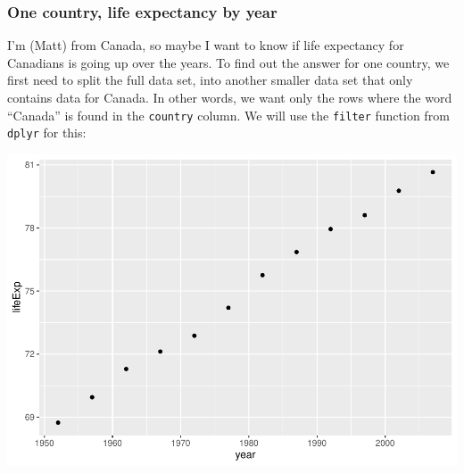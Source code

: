 \documentclass[]{book}
\newenvironment{Shaded}{\begin{snugshade}}{\end{snugshade}}
\newcommand{\KeywordTok}[1]{\textcolor[rgb]{0.13,0.29,0.53}{\textbf{#1}}}
\newcommand{\DataTypeTok}[1]{\textcolor[rgb]{0.13,0.29,0.53}{#1}}
\newcommand{\StringTok}[1]{\textcolor[rgb]{0.31,0.60,0.02}{#1}}
\newcommand{\CommentTok}[1]{\textcolor[rgb]{0.56,0.35,0.01}{\textit{#1}}}
\newcommand{\OperatorTok}[1]{\textcolor[rgb]{0.81,0.36,0.00}{\textbf{#1}}}
\newcommand{\NormalTok}[1]{#1}
\begin{document}
\subsubsection{One country, life expectancy by
year}\label{one-country-life-expectancy-by-year}

I'm (Matt) from Canada, so maybe I want to know if life expectancy for
Canadians is going up over the years. To find out the answer for one
country, we first need to split the full data set, into another smaller
data set that only contains data for Canada. In other words, we want
only the rows where the word ``Canada'' is found in the \texttt{country}
column. We will use the \texttt{filter} function from \texttt{dplyr} for
this:

\begin{Shaded}
\end{Shaded}

\includegraphics{Statistics_Lab_files/figure-latex/1scatterB-1.pdf}
\end{document}

